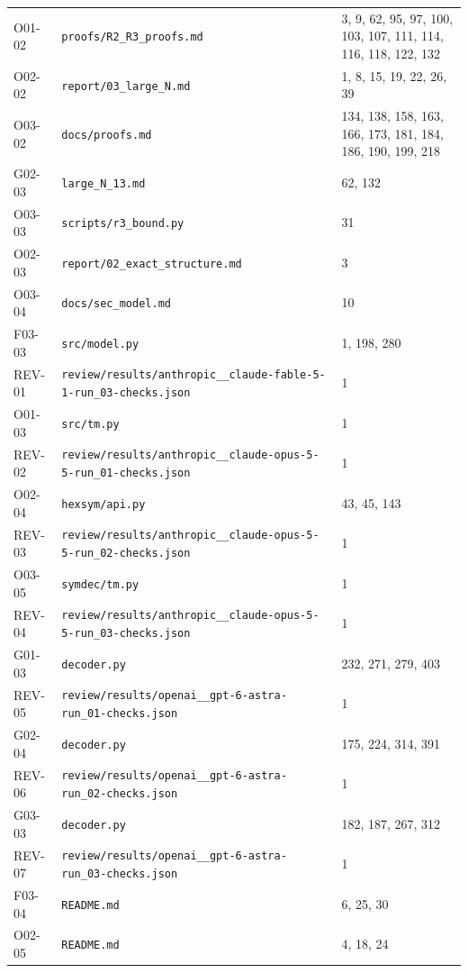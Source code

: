 \documentclass[11pt,a4paper]{article}
\begin{document}
{\begin{longtable}
{}\label{src:O01-02}O01-02 & \nolinkurl{proofs/R2_R3_proofs.md} & 3, 9, 62, 95, 97, 100, 103, 107, 111, 114, 116, 118, 122, 132\tabularnewline
{}\label{src:O02-02}O02-02 & \nolinkurl{report/03_large_N.md} & 1, 8, 15, 19, 22, 26, 39\tabularnewline
{}\label{src:O03-02}O03-02 & \nolinkurl{docs/proofs.md} & 134, 138, 158, 163, 166, 173, 181, 184, 186, 190, 199, 218\tabularnewline
{}\label{src:G02-03}G02-03 & \nolinkurl{large_N_13.md} & 62, 132\tabularnewline
{}\label{src:O03-03}O03-03 & \nolinkurl{scripts/r3_bound.py} & 31\tabularnewline
{}\label{src:O02-03}O02-03 & \nolinkurl{report/02_exact_structure.md} & 3\tabularnewline
{}\label{src:O03-04}O03-04 & \nolinkurl{docs/sec_model.md} & 10\tabularnewline
{}\label{src:F03-03}F03-03 & \nolinkurl{src/model.py} & 1, 198, 280\tabularnewline
{}\label{src:REV-01}REV-01 & \nolinkurl{review/results/anthropic__claude-fable-5-1-run_03-checks.json} & 1\tabularnewline
{}\label{src:O01-03}O01-03 & \nolinkurl{src/tm.py} & 1\tabularnewline
{}\label{src:REV-02}REV-02 & \nolinkurl{review/results/anthropic__claude-opus-5-5-run_01-checks.json} & 1\tabularnewline
{}\label{src:O02-04}O02-04 & \nolinkurl{hexsym/api.py} & 43, 45, 143\tabularnewline
{}\label{src:REV-03}REV-03 & \nolinkurl{review/results/anthropic__claude-opus-5-5-run_02-checks.json} & 1\tabularnewline
{}\label{src:O03-05}O03-05 & \nolinkurl{symdec/tm.py} & 1\tabularnewline
{}\label{src:REV-04}REV-04 & \nolinkurl{review/results/anthropic__claude-opus-5-5-run_03-checks.json} & 1\tabularnewline
{}\label{src:G01-03}G01-03 & \nolinkurl{decoder.py} & 232, 271, 279, 403\tabularnewline
{}\label{src:REV-05}REV-05 & \nolinkurl{review/results/openai__gpt-6-astra-run_01-checks.json} & 1\tabularnewline
{}\label{src:G02-04}G02-04 & \nolinkurl{decoder.py} & 175, 224, 314, 391\tabularnewline
{}\label{src:REV-06}REV-06 & \nolinkurl{review/results/openai__gpt-6-astra-run_02-checks.json} & 1\tabularnewline
{}\label{src:G03-03}G03-03 & \nolinkurl{decoder.py} & 182, 187, 267, 312\tabularnewline
{}\label{src:REV-07}REV-07 & \nolinkurl{review/results/openai__gpt-6-astra-run_03-checks.json} & 1\tabularnewline
{}\label{src:F03-04}F03-04 & \nolinkurl{README.md} & 6, 25, 30\tabularnewline
{}\label{src:O02-05}O02-05 & \nolinkurl{README.md} & 4, 18, 24\tabularnewline

\end{longtable}}
\end{document}
